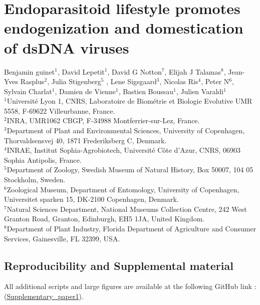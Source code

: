 \chapter{Endoparasitoid lifestyle promotes endogenization and domestication of dsDNA viruses}
    \label{chap:Domestication_within_parasitoids}

    \begin{center}
        \Large Benjamin guinet$^{\text{1}}$, David Lepetit$^{\text{1}}$, David G Notton$^{\text{7}}$, Elijah J Talamas$^{\text{8}}$, Jean-Yves Rasplus$^{\text{2}}$, Julia Stigenberg$^{\text{5}}$ , Lene Sigsgaard$^{\text{3}}$, Nicolas Ris$^{\text{4}}$, Peter N$^{\text{6}}$, Sylvain Charlat$^{\text{1}}$, Damien de Vienne$^{\text{1}}$, Bastien Boussau$^{\text{1}}$, Julien Varaldi$^{\text{1}}$\\
        \vspace{0.5cm}
        \scriptsize
        $^{\text{1}}${Université Lyon 1, CNRS, Laboratoire de Biométrie et Biologie Evolutive UMR 5558, F-69622 Villeurbanne, France.}\\
        $^{\text{2}}${INRA, UMR1062 CBGP, F-34988 Montferrier-sur-Lez, France.}\\
        $^{\text{3}}${Department of Plant and Environmental Sciences, University of Copenhagen, Thorvaldsensvej 40, 1871 Frederiksberg C, Denmark.}\\
        $^{\text{4}}${INRAE, Institut Sophia-Agrobiotech, Université Côte d'Azur, CNRS, 06903 Sophia Antipolis, France.}\\
        $^{\text{5}}${Department of Zoology, Swedish Museum of Natural History, Box 50007, 104 05 Stockholm, Sweden.}\\
        $^{\text{6}}${Zoological Museum, Department of Entomology, University of Copenhagen,
        Universitet sparken 15, DK-2100 Copenhagen, Denmark.}\\
        $^{\text{7}}${Natural Sciences Department, National Museums Collection Centre, 242 West Granton Road, Granton, Edinburgh, EH5 1JA, United Kingdom.}\\
        $^{\text{8}}${Department of Plant Industry, Florida Department of Agriculture and Consumer Services, Gainesville, FL 32399, USA.}\\
    \end{center}
     \setcounter{minitocdepth}{1}

    {\hypersetup{linkcolor=GREYDARK}\minitoc}
\clearpage

\label{sec:chap1}

\section{Reproducibility and Supplemental material}
All additional scripts and large figures are available at the following GitHub link : \newline (\href{https://github.com/BenjaminGuinet/PhD_defense/tree/main/Supplementary_paper1}{Supplementary\_paper1}).

